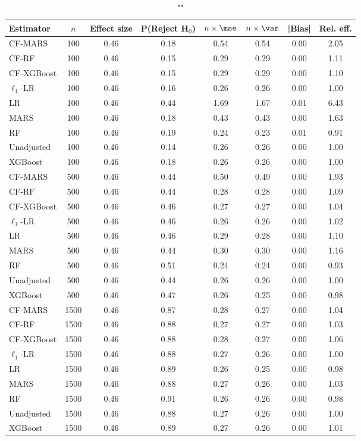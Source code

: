 \begin{table}
\centering
\caption{""}
\begin{tabular}{lccccccc}
\toprule
Estimator & $n$ & Effect size & P(Reject H$_0$) & $n\times\mse$ & $n\times \var$ & |Bias| & Rel. eff.\\ \midrule
CF-MARS & 100 & 0.46 & 0.18 & 0.54 & 0.54 & 0.00 & 2.05 \\ 
CF-RF & 100 & 0.46 & 0.15 & 0.29 & 0.29 & 0.00 & 1.11 \\ 
CF-XGBoost & 100 & 0.46 & 0.15 & 0.29 & 0.29 & 0.00 & 1.10 \\ 
$\ell_1$-LR & 100 & 0.46 & 0.16 & 0.26 & 0.26 & 0.00 & 1.00 \\ 
LR & 100 & 0.46 & 0.44 & 1.69 & 1.67 & 0.01 & 6.43 \\ 
MARS & 100 & 0.46 & 0.18 & 0.43 & 0.43 & 0.00 & 1.63 \\ 
RF & 100 & 0.46 & 0.19 & 0.24 & 0.23 & 0.01 & 0.91 \\ 
Unadjusted & 100 & 0.46 & 0.14 & 0.26 & 0.26 & 0.00 & 1.00 \\ 
XGBoost & 100 & 0.46 & 0.18 & 0.26 & 0.26 & 0.00 & 1.00 \\ \addlinespace 
CF-MARS & 500 & 0.46 & 0.44 & 0.50 & 0.49 & 0.00 & 1.93 \\ 
CF-RF & 500 & 0.46 & 0.44 & 0.28 & 0.28 & 0.00 & 1.09 \\ 
CF-XGBoost & 500 & 0.46 & 0.46 & 0.27 & 0.27 & 0.00 & 1.04 \\ 
$\ell_1$-LR & 500 & 0.46 & 0.46 & 0.26 & 0.26 & 0.00 & 1.02 \\ 
LR & 500 & 0.46 & 0.46 & 0.29 & 0.28 & 0.00 & 1.10 \\ 
MARS & 500 & 0.46 & 0.44 & 0.30 & 0.30 & 0.00 & 1.16 \\ 
RF & 500 & 0.46 & 0.51 & 0.24 & 0.24 & 0.00 & 0.93 \\ 
Unadjusted & 500 & 0.46 & 0.44 & 0.26 & 0.26 & 0.00 & 1.00 \\ 
XGBoost & 500 & 0.46 & 0.47 & 0.26 & 0.25 & 0.00 & 0.98 \\ \addlinespace 
CF-MARS & 1500 & 0.46 & 0.87 & 0.28 & 0.27 & 0.00 & 1.04 \\ 
CF-RF & 1500 & 0.46 & 0.88 & 0.27 & 0.27 & 0.00 & 1.03 \\ 
CF-XGBoost & 1500 & 0.46 & 0.88 & 0.28 & 0.27 & 0.00 & 1.06 \\ 
$\ell_1$-LR & 1500 & 0.46 & 0.88 & 0.27 & 0.26 & 0.00 & 1.00 \\ 
LR & 1500 & 0.46 & 0.89 & 0.26 & 0.25 & 0.00 & 0.98 \\ 
MARS & 1500 & 0.46 & 0.88 & 0.27 & 0.26 & 0.00 & 1.03 \\ 
RF & 1500 & 0.46 & 0.91 & 0.26 & 0.26 & 0.00 & 0.98 \\ 
Unadjusted & 1500 & 0.46 & 0.88 & 0.27 & 0.26 & 0.00 & 1.00 \\ 
XGBoost & 1500 & 0.46 & 0.89 & 0.27 & 0.26 & 0.00 & 1.01 \\
\bottomrule
\end{tabular}
\end{table}

